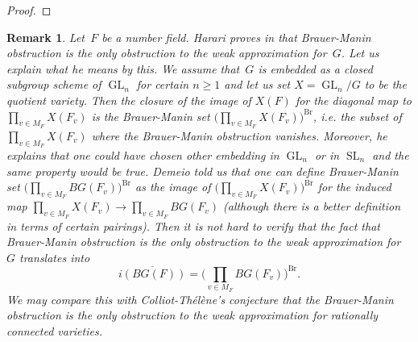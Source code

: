 \documentclass[a4paper,english,12pt]{amsart}
\newcommand{\RR}{\mathbb{R}}
\newcommand{\Fv}{F_v}
\newcommand{\vMF}{v\in M_F}
\DeclareMathOperator{\GL}{GL}
\DeclareMathOperator{\SL}{SL}
\DeclareMathOperator{\Br}{Br}
\newtheorem{rem}[equation]{Remark}
\numberwithin{equation}{subsection}
\begin{document}
\begin{proof}
\end{proof}
\begin{rem}
\normalfont Let~$F$ be a number field. Harari proves in \cite[Page 522]{haraprox} that {\it Brauer-Manin obstruction is the only obstruction to the weak approximation for~$G$}. Let us explain what he means by this. We assume that~$G$ is embedded as a closed subgroup scheme of $\GL_n$ for certain $n\geq 1$ and let us set $X=\GL_n/G$ to be the quotient variety. Then the closure of the image of $X(F)$ for the diagonal map to $\prod_{\vMF}X(F_v)$ is the Brauer-Manin set $\big(\prod_{\vMF}X(F_v)\big)^{\Br}$, i.e. the subset of $\prod_{\vMF}X(F_v)$ where the Brauer-Manin obstruction vanishes. Moreover, he explains that one could have chosen other embedding in $\GL_n$ or in $\SL_n$ and the same property would be true. Demeio told us that one can define Brauer-Manin set $\big(\prod_{\vMF}BG(F_v)\big)^{\Br}$ as the image of $\big(\prod_{\vMF}X(F_v)\big)^{\Br}$ for the induced map $\prod_{\vMF}X(\Fv)\to\prod_{\vMF}BG(F_v)$ (although there is a better definition in terms of certain pairings).  Then it is not hard to verify that the fact that Brauer-Manin obstruction is the only obstruction to the weak approximation for~$G$ translates into  $$\overline{i(BG(F))}=\bigg(\prod_{\vMF}BG(F_v)\bigg)^{\Br}.$$ 
We may compare this with Colliot-Th\' el\`ene's conjecture \cite[Conjecture 14.1.2]{brauergrothendieck} that the Brauer-Manin obstruction is the only obstruction to the weak approximation for rationally connected varieties.
\end{rem}
\end{document}
